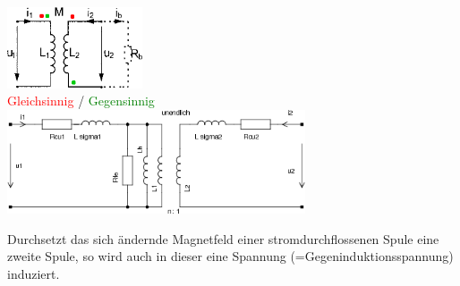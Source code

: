 \begin{multicols}{2}
\columnbreak
  		\begin{flushleft}
  		\includegraphics[width=4cm]{bilder/trafo-kopplung.png} \\
  		\small{\textcolor{red}{Gleichsinnig} / \textcolor{green}{Gegensinnig}} \\

	  	\includegraphics[width=8.8cm]{bilder/trafo-verluste.png}\\
		\end{flushleft}

	  	Durchsetzt das sich \"andernde Magnetfeld einer stromdurchflossenen Spule
	  	eine zweite Spule, so wird auch in dieser eine Spannung
	  	(=Gegeninduktionsspannung) induziert.\\
	
\end{multicols}